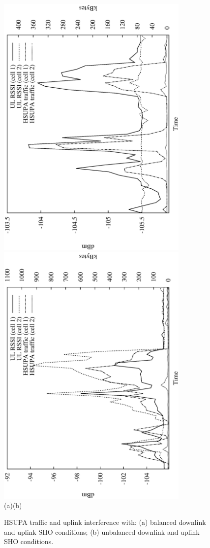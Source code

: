 \begin{figure}[tp]
\centering

\includegraphics[width=3.7in]{07-experimental_evaluation/img/network_normal}\includegraphics[width=3.7in]{07-experimental_evaluation/img/network_problem}\\\vskip -0.3in(a)\hspace*{3.6in}(b)

\caption{HSUPA traffic and uplink interference with: (a) balanced downlink
and uplink SHO conditions; (b) unbalanced downlink and uplink SHO
conditions.\label{fig:problem_illustration}}
\end{figure}


